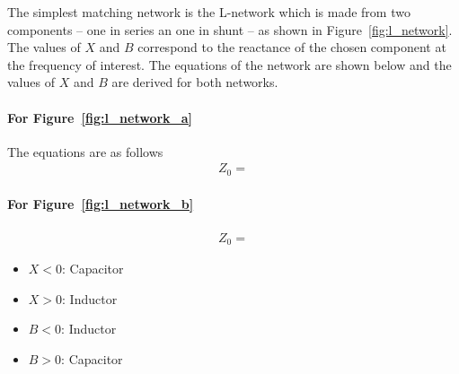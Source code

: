 The simplest matching network is the L-network which is made from two components -- one in series an one in shunt -- as shown in Figure~\ref{fig:l_network}. The values of $X$ and $B$ correspond to the reactance of the chosen component at the frequency of interest. The equations of the network are shown below and the values of $X$ and $B$ are derived for both networks.


\paragraph{For Figure~\ref{fig:l_network_a}}
The equations are as follows
\begin{align*}
    Z_0 = 
\end{align*}

\paragraph{For Figure~\ref{fig:l_network_b}}
\begin{align*}
    Z_0 = 
\end{align*}

\begin{itemize}
\item $X < 0$: Capacitor
\item $X > 0$: Inductor
\item $B < 0$: Inductor
\item $B > 0$: Capacitor
\end{itemize}




